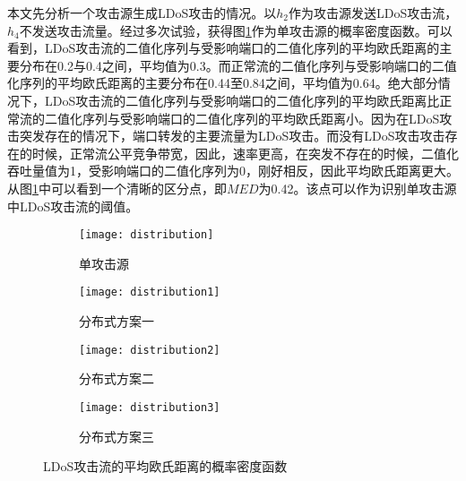 本文先分析一个攻击源生成LDoS攻击的情况。以$h_2$作为攻击源发送LDoS攻击流，$h_4$不发送攻击流量。经过多次试验，获得图\ref{fig:PDF-single}作为单攻击源的概率密度函数。可以看到，LDoS攻击流的二值化序列与受影响端口的二值化序列的平均欧氏距离的主要分布在0.2与0.4之间，平均值为0.3。而正常流的二值化序列与受影响端口的二值化序列的平均欧氏距离的主要分布在0.44至0.84之间，平均值为0.64。绝大部分情况下，LDoS攻击流的二值化序列与受影响端口的二值化序列的平均欧氏距离比正常流的二值化序列与受影响端口的二值化序列的平均欧氏距离小。因为在LDoS攻击突发存在的情况下，端口转发的主要流量为LDoS攻击。而没有LDoS攻击攻击存在的时候，正常流公平竞争带宽，因此，速率更高，在突发不存在的时候，二值化吞吐量值为1，受影响端口的二值化序列为0，刚好相反，因此平均欧氏距离更大。从图\ref{fig:PDF-single}中可以看到一个清晰的区分点，即$MED$为0.42。该点可以作为识别单攻击源中LDoS攻击流的阈值。


\begin{figure}
    \begin{subfigure}{.49\textwidth}
        \centering
        \texttt{[image: distribution]}
        \caption{单攻击源}
        \label{fig:PDF-single}
    \end{subfigure}
    \begin{subfigure}{.49\textwidth}
        \centering
        \texttt{[image: distribution1]}
        \caption{分布式方案一}
        \label{fig:PDF-2h-mod1}
    \end{subfigure}

    \begin{subfigure}{.49\textwidth}
        \centering
        \texttt{[image: distribution2]}
        \caption{分布式方案二}
        \label{fig:PDF-2h-mod2}
    \end{subfigure}
    \begin{subfigure}{.49\textwidth}
        \centering
        \texttt{[image: distribution3]}
        \caption{分布式方案三}
        \label{fig:PDF-2h-mod3}
    \end{subfigure}


    \caption{LDoS攻击流的平均欧氏距离的概率密度函数}
    \label{fig:PDF-all}
\end{figure}




